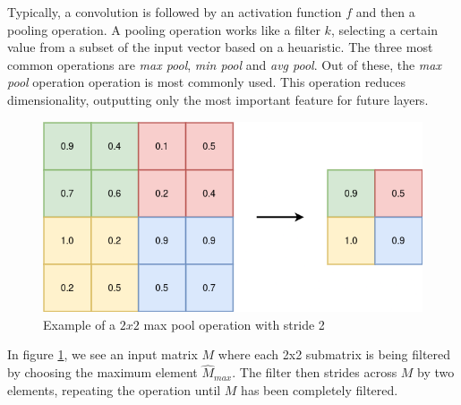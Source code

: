 Typically, a convolution is followed by an activation function $f$ and then a pooling operation. A pooling operation works like a filter $k$, selecting a certain value from a subset of the input vector based on a heuaristic. The three most common operations are \textit{max pool}, \textit{min pool} and \textit{avg pool}. Out of these, the \textit{max pool} operation operation is most commonly used. This operation reduces dimensionality, outputting only the most important feature for future layers. \\

\begin{figure}[!h]
    \centering
    \includegraphics[scale=0.4]{figures/pooling.png}
    \caption{Example of a $2 x 2$ max pool operation with stride 2}
    \label{fig:maxpool}
\end{figure}

In figure \ref{fig:maxpool}, we see an input matrix $M$ where each 2x2 submatrix is being filtered by choosing the maximum element $\hat{M}_{max}$. The filter then strides across $M$ by two elements, repeating the operation until $M$ has been completely filtered.